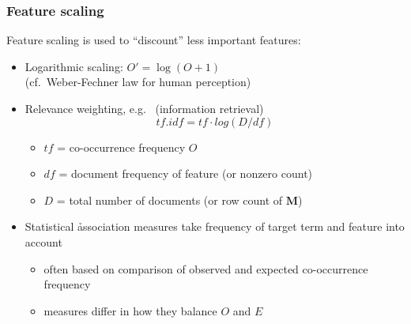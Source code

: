 \documentclass[t]{beamer} %
\begin{document}
\begin{frame}
  \frametitle{Feature scaling}

  Feature scaling is used to ``discount'' less important features:
  \begin{itemize}
  \item<1-> Logarithmic scaling: $O' = \log (O + 1)$\\
    (cf.\ Weber-Fechner law for human perception)
  \item<2-> Relevance weighting, e.g.\  (information retrieval)
    \[
    tf.idf = tf \cdot log(D / df)
    \]
    \ungap[1.5]
    \begin{itemize}
    \item $tf$ = co-occurrence frequency $O$
    \item $df$ = document frequency of feature (or nonzero count)
    \item $D$ = total number of documents (or row count of $\mathbf{M}$)
    \end{itemize}
  \item<3-> Statistical \h{association measures} \citep{Evert:04phd,Evert:08}
    take frequency of target term and feature into account
    \begin{itemize}
    \item often based on comparison of observed and expected co-occurrence frequency
    \item measures differ in how they balance $O$ and $E$
    \end{itemize}
  \end{itemize}
\end{frame}
\end{document}
